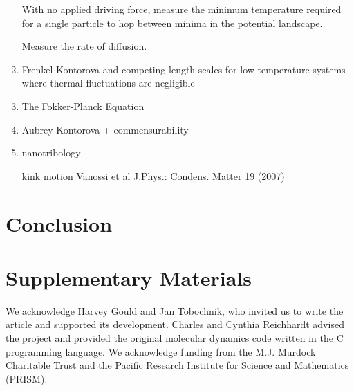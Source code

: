 \documentclass[twocolumn,preprintnumbers,amsmath,amssymb,aps,prx]{revtex4}
\begin{document}
\begin{enumerate}
  With no applied driving force, measure the minimum temperature required for a single particle to hop between minima in the potential landscape.

  Measure the rate of diffusion.

\item Frenkel-Kontorova and competing length scales for low temperature systems where thermal fluctuations are negligible

  \item The Fokker-Planck Equation

  \item Aubrey-Kontorova + commensurability

  \item nanotribology

    kink motion
    Vanossi et al J.Phys.: Condens. Matter 19 (2007)


    
\end{enumerate}

\section{Conclusion}
\label{sec:conclusion}	%

\section{Supplementary Materials}



\begin{acknowledgments}

  We acknowledge Harvey Gould and Jan Tobochnik,
  who invited us to write the article and
  supported its development.
  Charles and Cynthia Reichhardt advised 
  the project and provided the original molecular dynamics code
  written in the C programming language.
  We acknowledge funding from the M.J. Murdock Charitable Trust
  and the Pacific Research Institute for Science and Mathematics (PRISM).

\end{acknowledgments}
\end{document}
